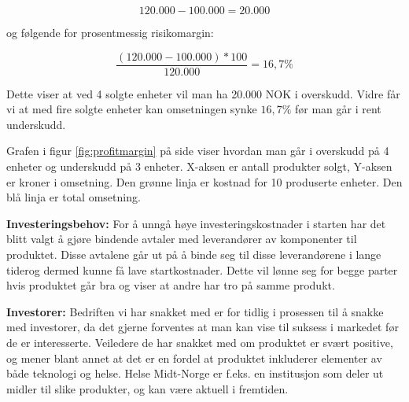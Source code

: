 $$ 120.000 - 100.000 = 20.000$$

og følgende for prosentmessig risikomargin:

$$ \frac{(120.000 - 100.000) * 100}{120.000} = 16,7 \% $$

Dette viser at ved 4 solgte enheter vil man ha 20.000 NOK i overskudd. Vidre får vi at med fire solgte enheter kan omsetningen synke $16,7 \%$ før man går i rent underskudd.

Grafen i figur \ref{fig:profitmargin} på side \pageref{fig:profitmargin} viser hvordan man går i overskudd på 4 enheter og underskudd på 3 enheter. X-aksen er antall produkter solgt, Y-aksen er kroner i omsetning. Den grønne linja er kostnad for 10 produserte enheter. Den blå linja er total omsetning.

\textbf{Investeringsbehov:}
For å unngå høye investeringskostnader i starten har det blitt valgt å gjøre bindende avtaler med leverandører av komponenter til produktet. Disse avtalene går ut på å binde seg til disse leverandørene i lange tiderog dermed kunne få lave startkostnader. Dette vil lønne seg for begge parter hvis produktet går bra og viser at andre har tro på samme produkt.

\textbf{Investorer:}
Bedriften vi har snakket med er for tidlig i prosessen til å snakke med investorer, da det gjerne forventes at man kan vise til suksess i markedet før de er interesserte.
Veiledere de har snakket med om produktet er svært positive, og mener blant annet at det er en fordel at produktet inkluderer elementer av både teknologi og helse. Helse Midt-Norge er f.eks. en institusjon som deler ut midler til slike produkter, og kan være aktuell i fremtiden.
